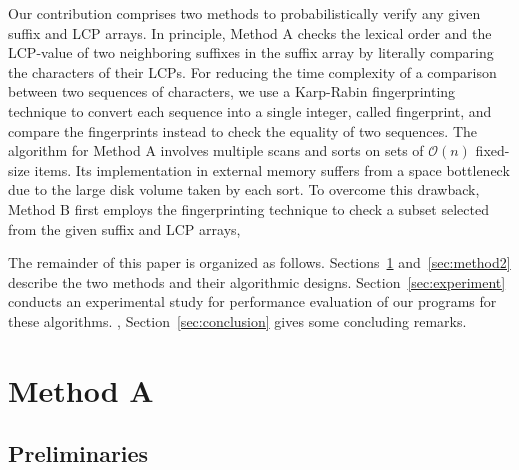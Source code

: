 \documentclass[10pt,journal,compsoc]{IEEEtran}
\begin{document}
Our contribution comprises two methods to probabilistically verify any given suffix and LCP arrays. In principle, Method A checks the lexical order and the LCP-value of two neighboring suffixes in the suffix array by literally comparing the characters of their LCPs. For reducing the time complexity of a comparison between two sequences of characters, we use a Karp-Rabin fingerprinting technique to convert each sequence into a single integer, called fingerprint, and compare the fingerprints instead to check the equality of two sequences. The algorithm for Method A involves multiple scans and sorts on sets of $\mathcal{O}(n)$ fixed-size items. Its implementation in external memory suffers from a space bottleneck due to the large disk volume taken by each sort. 
To overcome this drawback, Method B first employs the fingerprinting technique to check a subset selected from the given suffix and LCP arrays, 
{}

The remainder of this paper is organized as follows. Sections~\ref{sec:method1} and~\ref{sec:method2} describe the two methods and their algorithmic designs. Section~\ref{sec:experiment} conducts an experimental study for performance evaluation of our programs for these algorithms. {\color{red}{Finally}}, Section~\ref{sec:conclusion} gives some concluding remarks.

\section{Method A} \label{sec:method1}


\subsection{Preliminaries} \label{sec:method1:notations}
\end{document}
